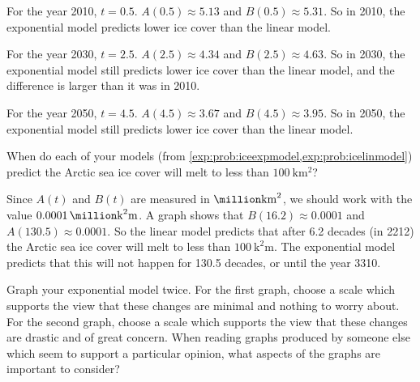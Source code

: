 \begin{problem}
\begin{subproblem}
\begin{shortsolution}
		For the year 2010, $t=0.5$. $A(0.5)\approx5.13$ and $B(0.5)\approx5.31$. So in 2010, the exponential model predicts lower ice cover than the linear model.
																
		For the year 2030, $t=2.5$. $A(2.5)\approx4.34$ and $B(2.5)\approx4.63$. So in 2030, the exponential model still predicts lower ice cover than the linear model, and the difference is larger than it was in 2010.
																
		For the year 2050, $t=4.5$. $A(4.5)\approx3.67$ and $B(4.5)\approx3.95$. So in 2050, the exponential model still predicts lower ice cover than the linear model.
	\end{shortsolution}
\end{subproblem}
\begin{subproblem}
	When do each of your models (from \cref{exp:prob:iceexpmodel,exp:prob:icelinmodel}) predict the Arctic sea ice cover will melt to less than $\SI{100}{\kilo\meter\squared}$?
	\begin{shortsolution}
		Since $A(t)$ and $B(t)$ are measured in $\si{\million\kilo\meter\squared}$, we should work with the value $\SI{0.0001}{\million\square\kilo\meter}$. A graph shows that $B(16.2)\approx0.0001$ and $A(130.5)\approx0.0001$. So the linear model predicts that after 6.2 decades (in 2212) the Arctic sea ice cover will melt to less than $\SI{100}{\square\kilo\meter}$. The exponential model predicts that this will not happen for 130.5 decades, or until the year 3310.
	\end{shortsolution}
\end{subproblem}
\begin{subproblem}
	Graph your exponential model twice.  For the first graph, choose a scale 
	which supports the view that these changes are minimal and nothing to 
	worry about.  For the second graph, choose a scale which supports the view that these changes are drastic and of great concern. When reading graphs produced by someone else which seem to support a particular opinion, what aspects of the graphs are important to consider?
	\begin{shortsolution}
																

\end{shortsolution}
\end{subproblem}
\end{problem}
